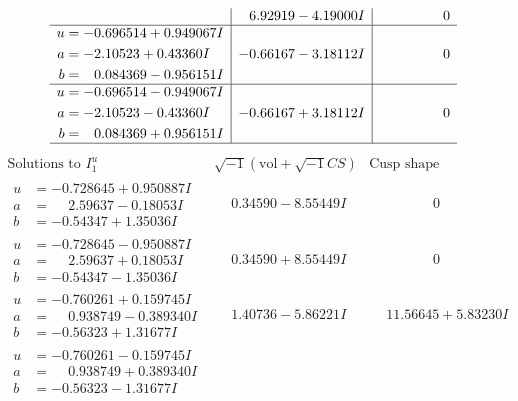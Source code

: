 \documentclass[1p]{elsarticle_modified}
\theoremstyle{definition}
\newcommand{\I}{\sqrt{-1}}
\begin{document}
$$\begin{array}{c|c|c}
 & \phantom{-}6.92919 - 4.19000 I & \phantom{-0.000000 } 0 \\ \hline\begin{aligned}
u &= -0.696514 + 0.949067 I \\
a &= -2.10523 + 0.43360 I \\
b &= \phantom{-}0.084369 - 0.956151 I\end{aligned}
 & -0.66167 - 3.18112 I & \phantom{-0.000000 } 0 \\ \hline\begin{aligned}
u &= -0.696514 - 0.949067 I \\
a &= -2.10523 - 0.43360 I \\
b &= \phantom{-}0.084369 + 0.956151 I\end{aligned}
 & -0.66167 + 3.18112 I & \phantom{-0.000000 } 0\\
 \hline 
 \end{array}$$\newpage$$\begin{array}{c|c|c}  
\text{Solutions to }I^u_{1}& \I (\text{vol} + \sqrt{-1}CS) & \text{Cusp shape}\\
 \hline 
\begin{aligned}
u &= -0.728645 + 0.950887 I \\
a &= \phantom{-}2.59637 - 0.18053 I \\
b &= -0.54347 + 1.35036 I\end{aligned}
 & \phantom{-}0.34590 - 8.55449 I & \phantom{-0.000000 } 0 \\ \hline\begin{aligned}
u &= -0.728645 - 0.950887 I \\
a &= \phantom{-}2.59637 + 0.18053 I \\
b &= -0.54347 - 1.35036 I\end{aligned}
 & \phantom{-}0.34590 + 8.55449 I & \phantom{-0.000000 } 0 \\ \hline\begin{aligned}
u &= -0.760261 + 0.159745 I \\
a &= \phantom{-}0.938749 - 0.389340 I \\
b &= -0.56323 + 1.31677 I\end{aligned}
 & \phantom{-}1.40736 - 5.86221 I & \phantom{-}11.56645 + 5.83230 I \\ \hline\begin{aligned}
u &= -0.760261 - 0.159745 I \\
a &= \phantom{-}0.938749 + 0.389340 I \\
b &= -0.56323 - 1.31677 I\end{aligned}

\end{array}$$
\end{document}
